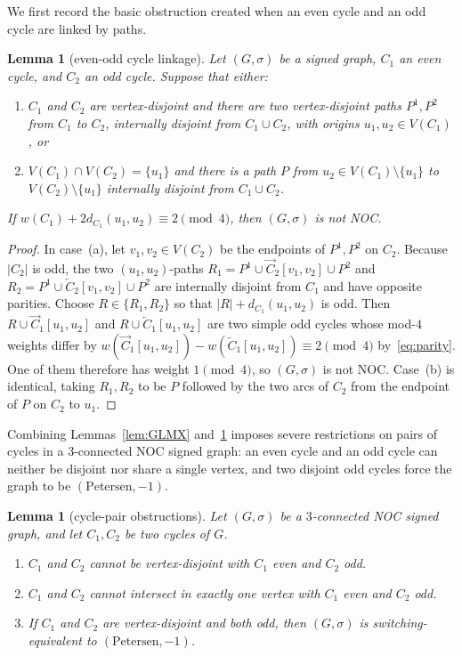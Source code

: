 \documentclass[10pt,letterpaper]{article}
\theoremstyle{zetaplain}
\newtheorem{lemma}[theorem]{Lemma}
\theoremstyle{zetadef}
\theoremstyle{remark}
\numberwithin{equation}{section}
\newcommand{\vecC}[1]{\overrightarrow{#1}}
\newcommand{\revC}[1]{\overleftarrow{#1}}
\begin{document}
We first record the basic obstruction created when an even cycle and an odd cycle are linked by paths.

\begin{lemma}[even-odd cycle linkage]\label{lem:evodd}
Let $(G, \sigma)$ be a signed graph, $C_1$ an even cycle, and $C_2$ an odd cycle. Suppose that either:
\begin{enumerate}
  \item[(a)] $C_1$ and $C_2$ are vertex-disjoint and there are two vertex-disjoint paths $P^1, P^2$ from $C_1$ to $C_2$, internally disjoint from $C_1 \cup C_2$, with origins $u_1, u_2 \in V(C_1)$, or
  \item[(b)] $V(C_1) \cap V(C_2) = \{u_1\}$ and there is a path $P$ from $u_2 \in V(C_1) \setminus \{u_1\}$ to $V(C_2) \setminus \{u_1\}$ internally disjoint from $C_1 \cup C_2$.
\end{enumerate}
If $w(C_1) + 2d_{C_1}(u_1, u_2) \equiv 2 \pmod 4$, then $(G, \sigma)$ is not NOC.
\end{lemma}

\begin{proof}
In case~(a), let $v_1, v_2 \in V(C_2)$ be the endpoints of $P^1, P^2$ on $C_2$. Because $|C_2|$ is odd, the two $(u_1, u_2)$-paths $R_1 = P^1 \cup \vecC{C}_2[v_1, v_2] \cup P^2$ and $R_2 = P^1 \cup \revC{C}_2[v_1, v_2] \cup P^2$ are internally disjoint from $C_1$ and have opposite parities. Choose $R \in \{R_1, R_2\}$ so that $|R| + d_{C_1}(u_1, u_2)$ is odd. Then $R \cup \vecC{C}_1[u_1, u_2]$ and $R \cup \revC{C}_1[u_1, u_2]$ are two simple odd cycles whose mod-$4$ weights differ by $w(\vecC{C}_1[u_1, u_2]) - w(\revC{C}_1[u_1, u_2]) \equiv 2 \pmod 4$ by~\eqref{eq:parity}. One of them therefore has weight $1 \pmod 4$, so $(G, \sigma)$ is not NOC. Case~(b) is identical, taking $R_1, R_2$ to be $P$ followed by the two arcs of $C_2$ from the endpoint of $P$ on $C_2$ to $u_1$.
\end{proof}

Combining Lemmas~\ref{lem:GLMX} and~\ref{lem:evodd} imposes severe restrictions on pairs of cycles in a $3$-connected NOC signed graph: an even cycle and an odd cycle can neither be disjoint nor share a single vertex, and two disjoint odd cycles force the graph to be $(\mathrm{Petersen}, -1)$.

\begin{lemma}[cycle-pair obstructions]\label{lem:cyclepairs}
Let $(G, \sigma)$ be a $3$-connected NOC signed graph, and let $C_1, C_2$ be two cycles of $G$.
\begin{enumerate}
  \item[(1)] $C_1$ and $C_2$ cannot be vertex-disjoint with $C_1$ even and $C_2$ odd.
  \item[(2)] $C_1$ and $C_2$ cannot intersect in exactly one vertex with $C_1$ even and $C_2$ odd.
  \item[(3)] If $C_1$ and $C_2$ are vertex-disjoint and both odd, then $(G, \sigma)$ is switching-equivalent to $(\mathrm{Petersen}, -1)$.
\end{enumerate}
\end{lemma}
\end{document}
